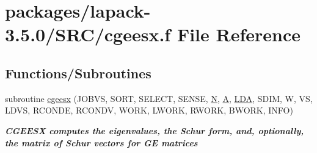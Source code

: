 \hypertarget{cgeesx_8f}{}\section{packages/lapack-\/3.5.0/\+S\+R\+C/cgeesx.f File Reference}
\label{cgeesx_8f}
\subsection*{Functions/\+Subroutines}
\begin{DoxyCompactItemize}
\item 
subroutine \hyperlink{group__complexGEeigen_ga788eda36c325ae49831c608588adaa69}{cgeesx} (J\+O\+B\+V\+S, S\+O\+R\+T, S\+E\+L\+E\+C\+T, S\+E\+N\+S\+E, \hyperlink{polmisc_8c_a0240ac851181b84ac374872dc5434ee4}{N}, \hyperlink{classA}{A}, \hyperlink{example__user_8c_ae946da542ce0db94dced19b2ecefd1aa}{L\+D\+A}, S\+D\+I\+M, W, V\+S, L\+D\+V\+S, R\+C\+O\+N\+D\+E, R\+C\+O\+N\+D\+V, W\+O\+R\+K, L\+W\+O\+R\+K, R\+W\+O\+R\+K, B\+W\+O\+R\+K, I\+N\+F\+O)
\begin{DoxyCompactList}\small\item\em {\bfseries  C\+G\+E\+E\+S\+X computes the eigenvalues, the Schur form, and, optionally, the matrix of Schur vectors for G\+E matrices} \end{DoxyCompactList}\end{DoxyCompactItemize}

